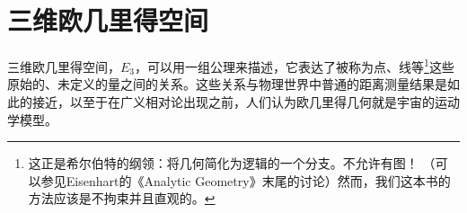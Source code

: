 \section{三维欧几里得空间}

三维欧几里得空间，$E_3$，可以用一组公理来描述，它表达了被称为点、线等\footnote{这正是希尔伯特的纲领：将几何简化为逻辑的一个分支。不允许有图！ （可以参见Eisenhart的《Analytic Geometry》末尾的讨论）然而，我们这本书的方法应该是不拘束并且直观的。}这些原始的、未定义的量之间的关系。这些关系与物理世界中普通的距离测量结果是如此的接近，以至于在广义相对论出现之前，人们认为欧几里得几何就是宇宙的运动学模型。



